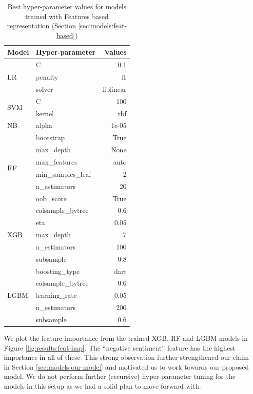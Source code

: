\begin{table}[htbp]
\centering
\begin{tabular}{llr}
\hline
\textbf{Model} & \textbf{Hyper-parameter} & \textbf{Values} \\ \hline
\multirow{3}{*}{LR} & C & 0.1 \\
 & penalty & l1 \\
 & solver & liblinear \\
 \hline
\multirow{2}{*}{SVM} & C & 100 \\
 & kernel & rbf \\
 \hline
NB & alpha & 1e-05 \\
 \hline
\multirow{6}{*}{RF} & bootstrap & True \\
 & max\_depth & None \\
 & max\_features & auto \\
 & min\_samples\_leaf & 2 \\
 & n\_estimators & 20 \\
 & oob\_score & True \\
 \hline
\multirow{5}{*}{XGB} & colsample\_bytree & 0.6 \\
 & eta & 0.05 \\
 & max\_depth & 7 \\
 & n\_estimators & 100 \\
 & subsample & 0.8 \\
 \hline
\multirow{5}{*}{LGBM} & boosting\_type & dart \\
 & colsample\_bytree & 0.6 \\
 & learning\_rate & 0.05 \\
 & n\_estimators & 200 \\
 & subsample & 0.6 \\ \hline
\end{tabular}
\caption{Best hyper-parameter values for models trained with Features based representation (Section \ref{sec:models:feat-based})}
\label{tab:best-hparams-feat-based}
\end{table}

We plot the feature importance from the trained \ac{XGB}, \ac{RF} and \ac{LGBM} models in Figure \ref{fig:results:feat-imp}. The ``negative sentiment'' feature has the highest importance in all of these. This strong observation further strengthened our claim in Section \ref{sec:models:our-model} and motivated us to work towards our proposed model. We do not perform further (recursive) hyper-parameter tuning for the models in this setup as we had a solid plan to move forward with.



